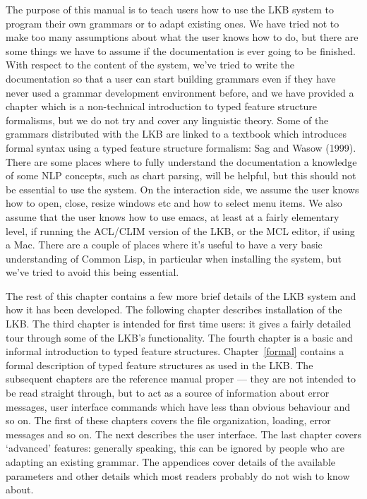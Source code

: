 \documentclass[12pt]{report}
\begin{document}
The purpose of this manual is to teach users how to use the LKB system
to program their own grammars or to adapt existing ones.
We have tried not to make too many assumptions
about what the user knows how to do, but there are some things we have 
to assume if the documentation is ever going to be finished.
With respect to the content of the system, we've tried to write the 
documentation so that a user can start building grammars even if
they have never used a grammar development environment before,
and we have provided a chapter which is a non-technical introduction
to typed feature structure formalisms,
but we do not try and cover any linguistic theory.
Some of the grammars distributed with the LKB are
linked to a textbook which introduces
formal syntax using a typed feature structure
formalism: Sag and Wasow (1999).
There are some places where to fully understand
the documentation a knowledge of some NLP concepts, such as chart parsing,
will be helpful, but this should not be essential to use the system.
On the interaction side,
we assume the user knows how to open, close, resize windows etc
and how to select menu items.  We also assume that the user knows
how to use emacs, at least at a fairly elementary level, if running
the ACL/CLIM version of the LKB, or the MCL editor, if using a Mac.
There are a couple of places where it's useful to have a 
very basic understanding of Common Lisp, in particular when installing the
system, but we've tried to avoid this being essential.
 
The rest of this chapter contains a few more brief details
of the LKB system and how it has been developed.
The following chapter describes installation of the LKB.
The third chapter
is intended for first time users: it gives
a fairly detailed tour through some of the LKB's functionality.
The fourth chapter is a basic
and informal introduction to typed feature structures.
Chapter~\ref{formal} contains a formal description
of typed feature structures as used in the LKB.
The subsequent chapters are the reference manual proper --- they
are not intended to be read straight through, but to act as 
a source of information about error messages,
user interface commands which have less than
obvious behaviour and so on.
The first of these chapters
covers the
file organization, loading, error messages and so on.  The
next describes the user interface.  The last chapter
covers `advanced' features: generally speaking, this can be
ignored by people who are adapting an existing grammar.
The appendices cover details of the
available parameters and other details which most readers probably
do not wish to know about.
\end{document}
